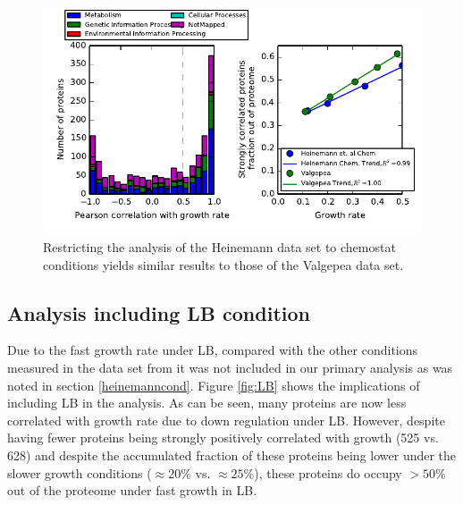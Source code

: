 \documentclass[a4paper]{article}
\begin{document}
\begin{figure}[H]
\begin{center}
\includegraphics[width=1\columnwidth]{Heinemann-chemosummaryHistAndGr.pdf}
\caption{\label{fig:growthcorrchemo}
  Restricting the analysis of the Heinemann data set to chemostat conditions yields similar results to those of the Valgepea data set.
}
\end{center}
\end{figure}

\subsection{Analysis including LB condition}
\label{lbanalysis}
Due to the fast growth rate under LB, compared with the other conditions measured in the data set from \cite{Heinemann2015} it was not included in our primary analysis as was noted in section \ref{heinemanncond}.
Figure \ref{fig:LB} shows the implications of including LB in the analysis.
As can be seen, many proteins are now less correlated with growth rate due to down regulation under LB.
However, despite having fewer proteins being strongly positively correlated with growth (525 vs. 628) and despite the accumulated fraction of these proteins being lower under the slower growth conditions ($\approx20\%$ vs. $\approx25\%$), these proteins do occupy $>50\%$ out of the proteome under fast growth in LB.
\end{document}
